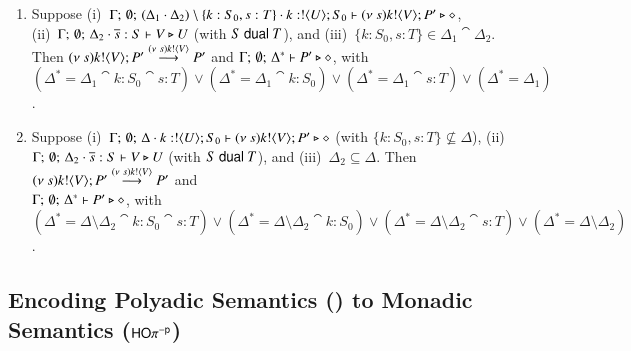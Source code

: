 \begin{lemma}
\begin{enumerate}[1.]
\item Suppose (i)~$\Gamma;\, \emptyset;\, (\Delta_1 \cdot \Delta_2) \setminus \{k:S_0, s:T\} \cdot k:! \langle U \rangle ; S_0 
\vdash (\nu\ s)k ! \langle V \rangle ; P' \triangleright \diamond$, \\
(ii)~$\Gamma;\, \emptyset;\, \Delta_2 \cdot \overline{s}:S \vdash V \triangleright U$ (with $S \ \mathsf{dual}\  T$),
and (iii)~$\{k:S_0, s:T\} \in \Delta_1 \cat \Delta_2$. \\
Then 
$(\nu\ s)k ! \langle V \rangle ; P' \stackrel{(\nu\ s)k ! \langle V \rangle}{\longrightarrow} P'$
and $\Gamma;\, \emptyset;\, \Delta^* \vdash P' \triangleright \diamond$, with \\
$(\Delta^* = \Delta_1 \cat k:S_0 \cat s:T) \lor (\Delta^* = \Delta_1 \cat k:S_0) \lor
(\Delta^* = \Delta_1 \cat  s:T) \lor (\Delta^* = \Delta_1)$.


\item Suppose (i)~$\Gamma;\, \emptyset;\, \Delta \cdot k:! \langle U \rangle ; S_0 
\vdash (\nu\ s)k ! \langle V \rangle ; P' \triangleright \diamond$
(with $\{k:S_0, s:T\} \not\subseteq \Delta$), 
(ii)~$\Gamma;\, \emptyset;\, \Delta_2 \cdot \overline{s}:S \vdash V \triangleright U$ (with $S \ \mathsf{dual}\  T$),
and (iii)~$\Delta_2 \subseteq \Delta$. 
Then $(\nu\ s)k ! \langle V \rangle ; P' \stackrel{(\nu\ s)k ! \langle V \rangle}{\longrightarrow} P'$ and \\
$\Gamma;\, \emptyset;\, \Delta^* \vdash P' \triangleright \diamond$, with \\
$(\Delta^* = \Delta \setminus \Delta_2 \cat k:S_0 \cat s:T) \lor (\Delta^* = \Delta \setminus \Delta_2 \cat k:S_0) \lor
(\Delta^* = \Delta \setminus \Delta_2 \cat  s:T) \lor (\Delta^* = \Delta \setminus \Delta_2)$.


\end{enumerate}
\end{lemma}

\subsection{Encoding Polyadic Semantics (\HOp) to Monadic Semantics ($\mathsf{HO}\pi^{-\mathsf{p}}$)}\label{ss:polmon}

